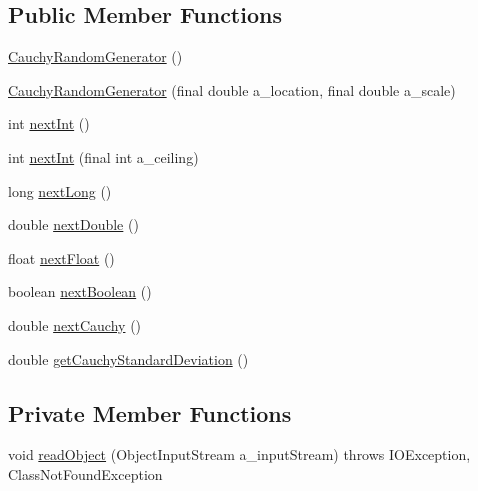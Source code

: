 \subsection*{Public Member Functions}
\begin{DoxyCompactItemize}
\item 
\hyperlink{classorg_1_1jgap_1_1impl_1_1_cauchy_random_generator_a103993b60163f18d281f0ceb35d57e90}{Cauchy\-Random\-Generator} ()
\item 
\hyperlink{classorg_1_1jgap_1_1impl_1_1_cauchy_random_generator_a7f4a7583b8b52569e49e9191792cb500}{Cauchy\-Random\-Generator} (final double a\-\_\-location, final double a\-\_\-scale)
\item 
int \hyperlink{classorg_1_1jgap_1_1impl_1_1_cauchy_random_generator_acf3fabb321753b72320c58eec7df3bdb}{next\-Int} ()
\item 
int \hyperlink{classorg_1_1jgap_1_1impl_1_1_cauchy_random_generator_a6ffce7b46aaee10397ff8af14971d47e}{next\-Int} (final int a\-\_\-ceiling)
\item 
long \hyperlink{classorg_1_1jgap_1_1impl_1_1_cauchy_random_generator_a560e1ee63aec73631c1df0fdd01b7141}{next\-Long} ()
\item 
double \hyperlink{classorg_1_1jgap_1_1impl_1_1_cauchy_random_generator_a187d4166f1b8a187a61c0f2058973de3}{next\-Double} ()
\item 
float \hyperlink{classorg_1_1jgap_1_1impl_1_1_cauchy_random_generator_a2ebaf9c01d0525ed47ffc6b4fada8abb}{next\-Float} ()
\item 
boolean \hyperlink{classorg_1_1jgap_1_1impl_1_1_cauchy_random_generator_ac264a286fef31aeda9a789366353d679}{next\-Boolean} ()
\item 
double \hyperlink{classorg_1_1jgap_1_1impl_1_1_cauchy_random_generator_a7225570041665b6da0460797b7d52ccc}{next\-Cauchy} ()
\item 
double \hyperlink{classorg_1_1jgap_1_1impl_1_1_cauchy_random_generator_ac137983fc618059f79e3c22cf18948c0}{get\-Cauchy\-Standard\-Deviation} ()
\end{DoxyCompactItemize}
\subsection*{Private Member Functions}
\begin{DoxyCompactItemize}
\item 
void \hyperlink{classorg_1_1jgap_1_1impl_1_1_cauchy_random_generator_a53607155b70065d698184ae8e96d9a2b}{read\-Object} (Object\-Input\-Stream a\-\_\-input\-Stream)  throws I\-O\-Exception, Class\-Not\-Found\-Exception 
\end{DoxyCompactItemize}
